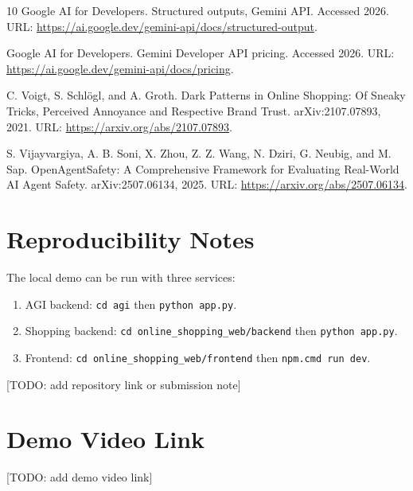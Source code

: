 \documentclass{article}
\begin{document}
\begin{thebibliography}{10}
Google AI for Developers.
\newblock Structured outputs, Gemini API.
\newblock Accessed 2026.
\newblock URL: \url{https://ai.google.dev/gemini-api/docs/structured-output}.

Google AI for Developers.
\newblock Gemini Developer API pricing.
\newblock Accessed 2026.
\newblock URL: \url{https://ai.google.dev/gemini-api/docs/pricing}.

C. Voigt, S. Schl{\"o}gl, and A. Groth.
\newblock Dark Patterns in Online Shopping: Of Sneaky Tricks, Perceived Annoyance and Respective Brand Trust.
\newblock arXiv:2107.07893, 2021.
\newblock URL: \url{https://arxiv.org/abs/2107.07893}.

S. Vijayvargiya, A. B. Soni, X. Zhou, Z. Z. Wang, N. Dziri, G. Neubig, and M. Sap.
\newblock OpenAgentSafety: A Comprehensive Framework for Evaluating Real-World AI Agent Safety.
\newblock arXiv:2507.06134, 2025.
\newblock URL: \url{https://arxiv.org/abs/2507.06134}.

\end{thebibliography}

\appendix

\section{Reproducibility Notes}
The local demo can be run with three services:
\begin{enumerate}[leftmargin=*]
  \item AGI backend: \texttt{cd agi} then \texttt{python app.py}.
  \item Shopping backend: \texttt{cd online\_shopping\_web/backend} then \texttt{python app.py}.
  \item Frontend: \texttt{cd online\_shopping\_web/frontend} then \texttt{npm.cmd run dev}.
\end{enumerate}

[TODO: add repository link or submission note]

\section{Demo Video Link}
[TODO: add demo video link]
\end{document}
